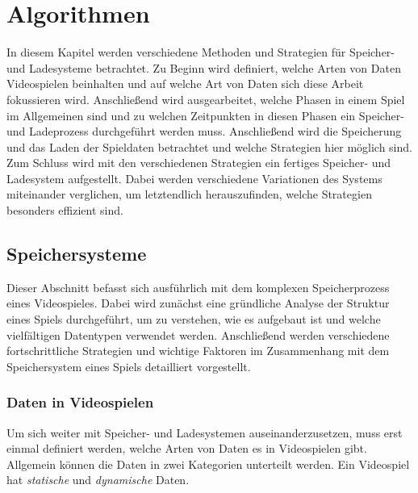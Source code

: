 \chapter{Algorithmen}\label{ch:algorithmen}
In diesem Kapitel werden verschiedene Methoden und Strategien für Speicher- und Ladesysteme betrachtet. Zu Beginn wird definiert, welche Arten von Daten Videospielen beinhalten und auf welche Art von Daten sich diese Arbeit fokussieren wird. Anschließend wird ausgearbeitet, welche Phasen in einem Spiel im Allgemeinen sind und zu welchen Zeitpunkten in diesen Phasen ein Speicher- und Ladeprozess durchgeführt werden muss. Anschließend wird die Speicherung und das Laden der Spieldaten betrachtet und welche Strategien hier möglich sind. Zum Schluss wird mit den verschiedenen Strategien ein fertiges Speicher- und Ladesystem aufgestellt. Dabei werden verschiedene Variationen des Systems miteinander verglichen, um letztendlich herauszufinden, welche Strategien besonders effizient sind.




\section{Speichersysteme}\label{sect:speichersysteme}
Dieser Abschnitt befasst sich ausführlich mit dem komplexen Speicherprozess eines Videospieles. Dabei wird zunächst eine gründliche Analyse der Struktur eines Spiels durchgeführt, um zu verstehen, wie es aufgebaut ist und welche vielfältigen Datentypen verwendet werden. Anschließend werden verschiedene fortschrittliche Strategien und wichtige Faktoren im Zusammenhang mit dem Speichersystem eines Spiels detailliert vorgestellt.


\subsection{Daten in Videospielen}
Um sich weiter mit Speicher- und Ladesystemen auseinanderzusetzen, muss erst einmal definiert werden, welche Arten von Daten es in Videospielen gibt. Allgemein können die Daten in zwei Kategorien unterteilt werden. Ein Videospiel hat \textit{statische} und \textit{dynamische} Daten.

